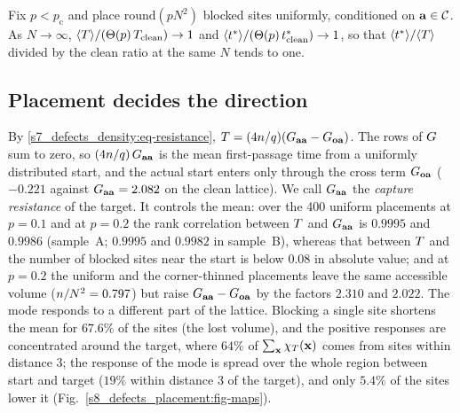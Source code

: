 \begin{conjecture}[Homogenisation]\label{s7_defects_density:conj-homog}
Fix $p<p_{\mathrm c}$ and place $\mathrm{round}(pN^{2})$ blocked sites uniformly, conditioned on $\mathbf{a}\in\mathcal{C}$. As
$N\to\infty$, $\langle T\rangle/(\Theta(p)\,T_{\mathrm{clean}})\to1$ and
$\langle t^{*}\rangle/(\Theta(p)\,t^{*}_{\mathrm{clean}})\to1$, so that $\langle t^{*}\rangle/\langle T\rangle$ divided by the
clean ratio at the same $N$ tends to one.
\end{conjecture}

\subsection{Placement decides the direction}\label{s8_defects_placement:ssec-capture}

By \eqref{s7_defects_density:eq-resistance}, $T=(4n/q)(G_{\mathbf{a}\mathbf{a}}-G_{\mathbf{o}\mathbf{a}})$. The rows of $G$ sum to zero, so
$(4n/q)\,G_{\mathbf{a}\mathbf{a}}$ is the mean first-passage time from a uniformly distributed start, and the actual start enters
only through the cross term $G_{\mathbf{o}\mathbf{a}}$ ($-0.221$ against $G_{\mathbf{a}\mathbf{a}}=2.082$ on the clean lattice). We call
$G_{\mathbf{a}\mathbf{a}}$ the \emph{capture resistance} of the target. It controls the mean: over the 400 uniform placements at
$p=0.1$ and at $p=0.2$ the rank correlation between $T$ and $G_{\mathbf{a}\mathbf{a}}$ is $0.9995$ and $0.9986$ (sample~A; $0.9995$ and
$0.9982$ in sample~B), whereas that between $T$ and the number of blocked sites near the start is below $0.08$ in
absolute value; and at $p=0.2$ the uniform and the corner-thinned placements leave the same accessible volume
($n/N^{2}=0.797$) but raise $G_{\mathbf{a}\mathbf{a}}-G_{\mathbf{o}\mathbf{a}}$ by the factors $2.310$ and $2.022$.
The mode responds to a different part of the lattice. Blocking a single site shortens the mean for $67.6\%$ of the sites
(the lost volume), and the positive responses are concentrated around the target, where $64\%$ of $\sum_{\mathbf{x}}\chi_{T}(\mathbf{x})$ comes
from sites within distance 3; the response of the mode is spread over the whole region between start and target
($19\%$ within distance 3 of the target), and only $5.4\%$ of the sites lower it
(Fig.~\ref{s8_defects_placement:fig-maps}).

